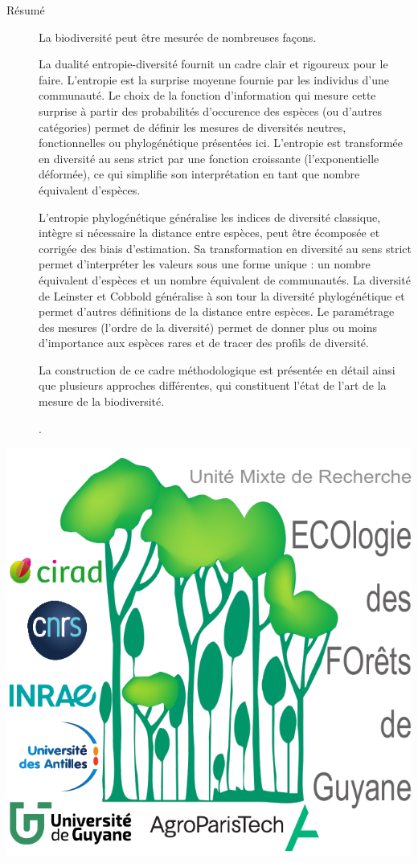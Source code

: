\documentclass[
  11pt,
  american,
  a4paper,
  extrafontsizes,onecolumn,openright
  ]{memoir}
\begin{document}
\begin{normalsize}

\begin{description}

\item[Résumé]
La biodiversité peut être mesurée de nombreuses façons.

La dualité entropie-diversité fournit un cadre clair et rigoureux pour le faire.
L'entropie est la surprise moyenne fournie par les individus d'une communauté.
Le choix de la fonction d'information qui mesure cette surprise à partir des probabilités d'occurence des espèces (ou d'autres catégories) permet de définir les mesures de diversités neutres, fonctionnelles ou phylogénétique présentées ici.
L'entropie est transformée en diversité au sens strict par une fonction croissante (l'exponentielle déformée), ce qui simplifie son interprétation en tant que nombre équivalent d'espèces.

L'entropie phylogénétique généralise les indices de diversité classique, intègre si nécessaire la distance entre espèces, peut être écomposée et corrigée des biais d'estimation.
Sa transformation en diversité au sens strict permet d'interpréter les valeurs sous une forme unique : un nombre équivalent d'espèces et un nombre équivalent de communautés.
La diversité de Leinster et Cobbold généralise à son tour la diversité phylogénétique et permet d'autres définitions de la distance entre espèces.
Le paramétrage des mesures (l'ordre de la diversité) permet de donner plus ou moins d'importance aux espèces rares et de tracer des profils de diversité.

La construction de ce cadre méthodologique est présentée en détail ainsi que plusieurs approches différentes, qui constituent l'état de l'art de la mesure de la biodiversité.
\item[]
.
~\\

\end{description}

\end{normalsize}

\vspace*{\fill}
\centering\includegraphics[width=.3\textwidth]{images/logo}
\end{document}
